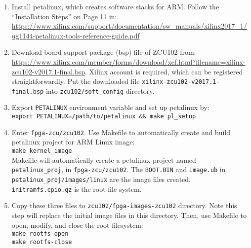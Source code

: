 \documentclass[a4paper,11pt]{article}
\begin{document}
\begin{enumerate}
\item Install petalinux, which creates software stacks for ARM. Follow the ``Installation Steps'' on Page 11 in: \url{https://www.xilinx.com/support/documentation/sw_manuals/xilinx2017_1/ug1144-petalinux-tools-reference-guide.pdf}

\item Download board support package (bsp) file of ZCU102 from: \url{https://www.xilinx.com/member/forms/download/xef.html?filename=xilinx-zcu102-v2017.1-final.bsp}. Xilinx account is required, which can be registered straightforwardly. Put  the downloaded file {\tt xilinx-zcu102-v2017.1-final.bsp} into {\tt zcu102/soft\_config} directory.


\item Export {\tt PETALINUX} environment variable and set up petalinux by:\\
{\tt export PETALINUX=/path/to/petalinux \&\& make pl\_setup}

\item Enter {\tt fpga-zcu/zcu102}. Use Makefile to automatically create and build petalinux project for ARM Linux image:\\
{\tt make kernel\_image}\\
Makefile will automatically create a petalinux project named {\tt petalinux\_proj}, in {\tt fpga-zcu/zcu102}.
The {\tt BOOT.BIN} and {\tt image.ub} in {\tt petalinux\_proj/images/linux} are the image files created. {\tt initramfs.cpio.gz} is the root file system.

\item Copy these three files to {\tt zcu102/fpga-images-zcu102} directory. Note this step will replace the initial image files in this directory. Then, use Makefile to open, modify, and close the root filesystem:\\
{\tt make rootfs-open}\\
{\tt make rootfs-close}
\end{enumerate}
\end{document}
